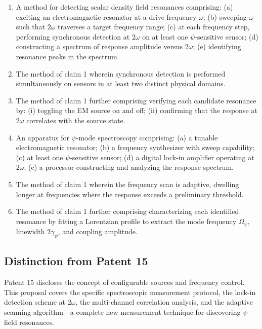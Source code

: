 \documentclass[11pt,a4paper]{article}
\begin{document}
\begin{enumerate}
\item A method for detecting scalar density field resonances
comprising: (a) exciting an electromagnetic resonator at a
drive frequency $\omega$; (b) sweeping $\omega$ such that
$2\omega$ traverses a target frequency range; (c) at each
frequency step, performing synchronous detection at $2\omega$
on at least one $\psi$-sensitive sensor; (d) constructing a
spectrum of response amplitude versus $2\omega$; (e) identifying
resonance peaks in the spectrum.

\item The method of claim 1 wherein synchronous detection is
performed simultaneously on sensors in at least two distinct
physical domains.

\item The method of claim 1 further comprising verifying each
candidate resonance by: (i) toggling the EM source on and off;
(ii) confirming that the response at $2\omega$ correlates with
the source state.

\item An apparatus for $\psi$-mode spectroscopy comprising:
(a) a tunable electromagnetic resonator; (b) a frequency
synthesizer with sweep capability; (c) at least one
$\psi$-sensitive sensor; (d) a digital lock-in amplifier
operating at $2\omega$; (e) a processor constructing and
analyzing the response spectrum.

\item The method of claim 1 wherein the frequency scan
is adaptive, dwelling longer at frequencies where the
response exceeds a preliminary threshold.

\item The method of claim 1 further comprising characterizing
each identified resonance by fitting a Lorentzian profile to
extract the mode frequency $\Omega_\psi$, linewidth
$2\gamma_\psi$, and coupling amplitude.
\end{enumerate}

\subsection{Distinction from Patent 15}

Patent 15 discloses the concept of configurable sources and
frequency control.  This proposal covers the specific
spectroscopic measurement protocol, the lock-in detection
scheme at $2\omega$, the multi-channel correlation analysis,
and the adaptive scanning algorithm---a complete new measurement
technique for discovering $\psi$-field resonances.
\end{document}

